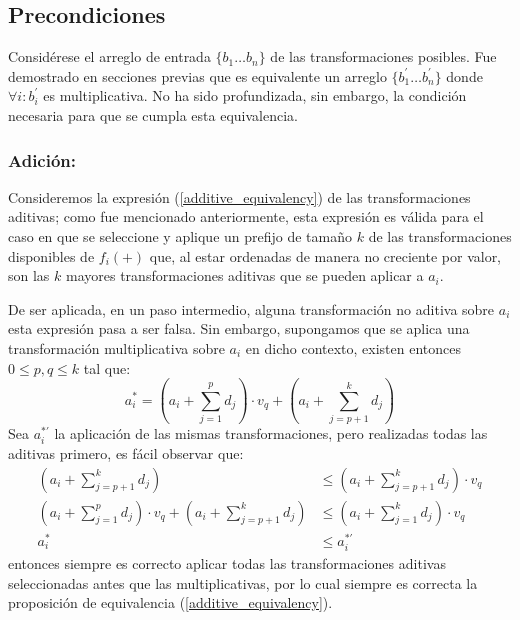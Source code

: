 \documentclass{article}
\theoremstyle{default}
\begin{document}
	\subsection{Precondiciones}
		Considérese el arreglo de entrada $\{b_1 \dots b_n\}$ de las transformaciones posibles. Fue demostrado en secciones previas que es equivalente un arreglo $\{b_1^\prime \dots b_n^\prime\}$ donde $\forall i: b_i^\prime$ es multiplicativa. No ha sido profundizada, sin embargo, la condición necesaria para que se cumpla esta equivalencia.
		\subsubsection{Adición:}
		\label{additive_equivalency_proof}
		Consideremos la expresión (\ref{additive_equivalency}) de las transformaciones aditivas; como fue mencionado anteriormente, esta expresión es válida para el caso en que se seleccione y aplique un prefijo de tamaño $k$ de las transformaciones disponibles de $f_i(+)$ que, al estar ordenadas de manera no creciente por valor, son las $k$ mayores transformaciones aditivas que se pueden aplicar a $a_i$.

		De ser aplicada, en un paso intermedio, alguna transformación no aditiva sobre $a_i$ esta expresión pasa a ser falsa. Sin embargo, supongamos que se aplica una transformación multiplicativa sobre $a_i$ en dicho contexto, existen entonces $0 \leq p,q \leq k$ tal que:
%
		\begin{equation*}
			a_i^{*} = \left(a_i + \sum\limits_{j=1}^{p}{d_j}\right)
					\cdot v_q + 
					\left(a_i + \sum\limits_{j=p+1}^{k}{d_j}\right) 
		\end{equation*}
%
		Sea $a_i^{*\prime}$ la aplicación de las mismas transformaciones, pero realizadas todas las aditivas primero, es fácil observar que:
%
		\begin{align}
			\nonumber
			\left(a_i + \sum\limits_{j=p+1}^{k}{d_j}\right)
				&\leq
				\left(a_i + \sum\limits_{j=p+1}^{k}{d_j}\right) \cdot v_q
			\\ \nonumber
			\left(a_i + \sum\limits_{j=1}^{p}{d_j}\right)
					\cdot v_q + 
					\left(a_i + \sum\limits_{j=p+1}^{k}{d_j}\right)
				&\leq
				\left(a_i + \sum\limits_{j=1}^{k}{d_j}\right) \cdot v_q
			\\
			a_i^* &\leq a_i^{*\prime} 
		\end{align}
%
		entonces siempre es correcto aplicar todas las transformaciones aditivas seleccionadas antes que las multiplicativas, por lo cual siempre es correcta la proposición de equivalencia (\ref{additive_equivalency}).
%
\end{document}
